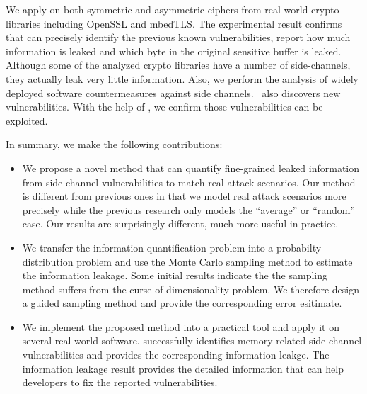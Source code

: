 We apply \tool{} on both symmetric and asymmetric ciphers from
real-world crypto libraries including OpenSSL and mbedTLS\@. The
experimental result confirms that \tool{} can precisely identify the
previous known vulnerabilities, report how much information is leaked
and which byte in the original sensitive buffer is leaked.  Although
some of the analyzed crypto libraries have a number of side-channels,
they actually leak very little information. Also, we perform the
analysis of widely deployed software countermeasures against side
channels.  \tool\ also discovers new vulnerabilities. With the help of
\tool{}, we confirm those vulnerabilities can be exploited.

In summary, we make the following contributions:

\begin{itemize}
  \item We propose a novel method that can quantify fine-grained
    leaked information from side-channel vulnerabilities to match real
    attack scenarios.  Our method is different from previous ones in
    that we model real attack scenarios more precisely while the
    previous research only models the ``average'' or ``random'' case.
    Our results are surprisingly different,
    much more useful in practice.
        
  \item We transfer the information quantification problem into a
    probabilty distribution problem and use the Monte Carlo sampling
    method to estimate the information leakage. Some initial results
    indicate the the sampling method suffers from the curse of
    dimensionality problem. We therefore design a guided sampling
    method and provide the corresponding error esitimate.
        
  \item We implement the proposed method into a practical tool and
    apply it on several real-world software. \tool{} successfully
    identifies memory-related side-channel vulnerabilities and
    provides the corresponding information leakge. The information
    leakage result provides the detailed information that can help
    developers to fix the reported vulnerabilities.
\end{itemize}
